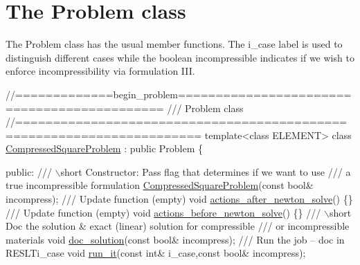  

\hypertarget{index_class}{}\section{The Problem class}\label{index_class}
The {\ttfamily Problem} class has the usual member functions. The {\ttfamily i\+\_\+case} label is used to distinguish different cases while the boolean {\ttfamily incompressible} indicates if we wish to enforce incompressibility via formulation I\+II.

 
\begin{DoxyCodeInclude}
\textcolor{comment}{//=============begin\_problem============================================ }
\textcolor{comment}{/// Problem class}
\textcolor{comment}{}\textcolor{comment}{//====================================================================== }
\textcolor{keyword}{template}<\textcolor{keyword}{class} ELEMENT>
\textcolor{keyword}{class }\hyperlink{classCompressedSquareProblem}{CompressedSquareProblem} : \textcolor{keyword}{public} Problem
\{

\textcolor{keyword}{public}:
\textcolor{comment}{}
\textcolor{comment}{ /// \(\backslash\)short Constructor: Pass flag that determines if we want to use}
\textcolor{comment}{ /// a true incompressible formulation}
\textcolor{comment}{} \hyperlink{classCompressedSquareProblem_af013df43f2a9f6ee8ff16cf59ddd9439}{CompressedSquareProblem}(\textcolor{keyword}{const} \textcolor{keywordtype}{bool}& incompress);
 \textcolor{comment}{}
\textcolor{comment}{ /// Update function (empty)}
\textcolor{comment}{} \textcolor{keywordtype}{void} \hyperlink{classCompressedSquareProblem_afef46d13ff7c8b2845e96a84762077dc}{actions\_after\_newton\_solve}() \{\}
\textcolor{comment}{}
\textcolor{comment}{ /// Update function (empty)}
\textcolor{comment}{} \textcolor{keywordtype}{void} \hyperlink{classCompressedSquareProblem_aed8338e212b31c56a5df20c222385e15}{actions\_before\_newton\_solve}() \{\}
\textcolor{comment}{}
\textcolor{comment}{ /// \(\backslash\)short Doc the solution & exact (linear) solution for compressible }
\textcolor{comment}{ /// or incompressible materials}
\textcolor{comment}{} \textcolor{keywordtype}{void} \hyperlink{classCompressedSquareProblem_a34d511f377379122d65b2a1402898f5c}{doc\_solution}(\textcolor{keyword}{const} \textcolor{keywordtype}{bool}& incompress);
\textcolor{comment}{}
\textcolor{comment}{ /// Run the job -- doc in RESLTi\_case}
\textcolor{comment}{} \textcolor{keywordtype}{void} \hyperlink{classCompressedSquareProblem_a1543bb8bcba7bf3491e29d141faaf774}{run\_it}(\textcolor{keyword}{const} \textcolor{keywordtype}{int}& i\_case,\textcolor{keyword}{const} \textcolor{keywordtype}{bool}& incompress);


\end{DoxyCodeInclude}
